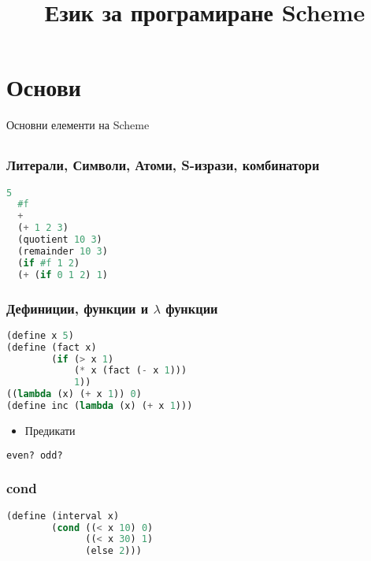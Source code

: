 \documentclass{beamer}
\begin{document}
\title[Scheme]{Език за програмиране Scheme}
\frame{\titlepage}

\section{Основи}

\begin{frame}
  \centerline{Основни елементи на Scheme}
\end{frame}


\subsection{}

\begin{frame}[fragile]
\frametitle{Литерали, Символи, Атоми, S-изрази, комбинатори}

\begin{lstlisting}[basicstyle=\small\ttfamily,language=Lisp]
  5
  #f
  +
  (+ 1 2 3)
  (quotient 10 3)
  (remainder 10 3)
  (if #f 1 2)
  (+ (if 0 1 2) 1)
\end{lstlisting}

\end{frame}


\begin{frame}[fragile]
\frametitle{Дефиниции, функции и $\lambda$ функции}

\begin{lstlisting}[language=Lisp]
(define x 5)
(define (fact x) 
        (if (> x 1) 
            (* x (fact (- x 1))) 
            1))
((lambda (x) (+ x 1)) 0)
(define inc (lambda (x) (+ x 1)))
\end{lstlisting}
\begin{itemize}
  \item Предикати
\end{itemize}

\begin{lstlisting}[language=Lisp]
  even? odd?
\end{lstlisting}

\end{frame}

\begin{frame}[fragile]
\frametitle{cond}
\begin{lstlisting}[language=Lisp]
(define (interval x) 
        (cond ((< x 10) 0) 
              ((< x 30) 1) 
              (else 2)))  
\end{lstlisting}
\end{frame}
\end{document}
